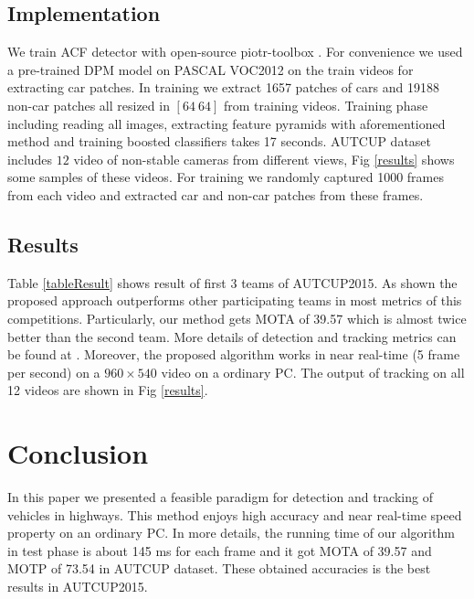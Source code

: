 \documentclass[conference]{IEEEtran}
\begin{document}
\subsection{Implementation}
We train ACF detector with open-source piotr-toolbox \cite{PMT}.  For convenience we used a pre-trained DPM model on PASCAL VOC2012 on the train videos for extracting car patches. In training we extract 1657 patches of cars and 19188 non-car patches all resized in $[64\ 64]$ from training videos. Training phase including reading all images, extracting feature pyramids with aforementioned method and training boosted classifiers takes 17 seconds.
AUTCUP dataset includes $12$ video of non-stable cameras from different views, Fig \ref{results} shows some samples of these videos. For training we randomly captured 1000  frames from each video and extracted car and non-car patches from these frames.

\subsection{Results} 
Table \ref{tableResult} shows result of first 3 teams of AUTCUP2015. As shown the proposed approach outperforms other participating teams in most metrics of this competitions. Particularly, our method gets MOTA of 39.57 which is almost twice better than the second team. More details of detection and tracking metrics can be found at \cite{}.
Moreover, the proposed algorithm works in near real-time (5 frame per second) on a $960\times 540$ video on a ordinary PC.
The output of tracking on all 12 videos are shown in Fig \ref{results}. 


\section{Conclusion}
In this paper we presented a feasible paradigm for detection and tracking of vehicles in highways. This method enjoys high accuracy and near real-time speed property on an ordinary PC. In more details, the running time of our algorithm in test phase is about 145 ms for each frame and it got MOTA of 39.57 and MOTP of 73.54 in AUTCUP dataset. These obtained accuracies is the best results in AUTCUP2015.
\end{document}
